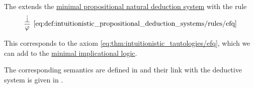 \begin{definition}\label{def:intuitionistic_propositional_deduction_systems}
  The  extends the \hyperref[def:minimal_propositional_natural_deduction_system]{minimal propositional natural deduction system} with the rule
  \begin{equation*}\taglabel[\logic{EFQ}]{eq:def:intuitionistic_propositional_deduction_systems/rules/efq}
    \begin{prooftree}
      \hypo{ \synbot }
      \infer1[\ref{eq:def:intuitionistic_propositional_deduction_systems/rules/efq}]{ \varphi }
    \end{prooftree}
  \end{equation*}
\end{definition}
\begin{comments}
  \item This corresponds to the axiom \eqref{eq:thm:intuitionistic_tautologies/efq}, which we can add to the \hyperref[def:minimal_implicational_logic]{minimal implicational logic}.
  \item The corresponding semantics are defined in  and their link with the deductive system is given in .
\end{comments}

